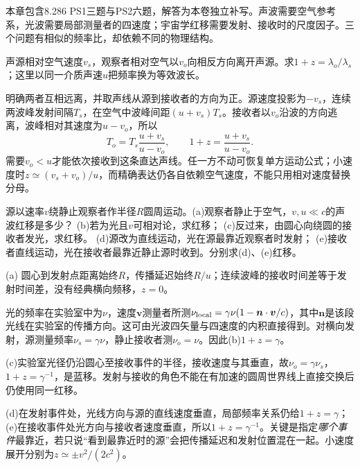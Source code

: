 本章包含8.286 PS1三题与PS2六题，解答为本卷独立补写。声波需要空气参考系，光波需要局部测量者的四速度；宇宙学红移需要发射、接收时的尺度因子。三个问题有相似的频率比，却依赖不同的物理结构。

\begin{exercise}
声源相对空气速度$v_s$，观察者相对空气以$v_o$向相反方向离开声源。求$1+z=\lambda_o/\lambda_s$；这里以同一介质声速$u$把频率换为等效波长。
\end{exercise}
\begin{solution}
明确两者互相远离，并取声线从源到接收者的方向为正。源速度投影为$-v_s$，连续两波峰发射间隔$T_s$，在空气中波峰间距$(u+v_s)T_s$。接收者以$v_o$沿波的方向逃离，波峰相对其速度为$u-v_o$，所以
\[
 T_o=T_s\frac{u+v_s}{u-v_o},\qquad
 1+z=\frac{u+v_s}{u-v_o}.
\]
需要$v_o<u$才能依次接收到这条直达声线。任一方不动可恢复单方运动公式；小速度时$z\simeq(v_s+v_o)/u$，而精确表达仍各自依赖空气速度，不能只用相对速度替换分母。
\end{solution}

\begin{exercise}
源以速率$v$绕静止观察者作半径$R$圆周运动。(a)观察者静止于空气，$v,u\ll c$的声波红移是多少？
(b)若为光且$v$可相对论，求红移；
(c)反过来，由圆心向绕圆的接收者发光，求红移。
(d)源改为直线运动，光在源最靠近观察者时发射；
(e)接收者直线运动，光在接收者最靠近静止源时收到。分别求(d)、(e)红移。
\end{exercise}
\begin{solution}
(a) 圆心到发射点距离始终$R$，传播延迟始终$R/u$；连续波峰的接收时间差等于发射时间差，没有经典横向频移，$z=0$。

光的频率在实验室中为$\nu$，速度$\boldsymbol v$测量者所测$\nu_{\rm local}=\gamma\nu(1-\boldsymbol n\cdot\boldsymbol v/c)$，其中$\boldsymbol n$是该段光线在实验室的传播方向。这可由光波四矢量与四速度的内积直接得到。对横向发射，源测量频率$\nu_s=\gamma\nu$，静止接收者测$\nu_o=\nu$。因此(b)$1+z=\gamma$。

(c)实验室光径仍沿圆心至接收事件的半径，接收速度与其垂直，故$\nu_o=\gamma\nu_s$，$1+z=\gamma^{-1}$，是蓝移。发射与接收的角色不能在有加速的圆周世界线上直接交换后仍使用同一红移。

(d)在发射事件处，光线方向与源的直线速度垂直，局部频率关系仍给$1+z=\gamma$；(e)在接收事件处光方向与接收者速度垂直，所以$1+z=\gamma^{-1}$。关键是指定\emph{哪个事件}最靠近，若只说“看到最靠近时的源”会把传播延迟和发射位置混在一起。小速度展开分别为$z\simeq\pm v^2/(2c^2)$。
\end{solution}

